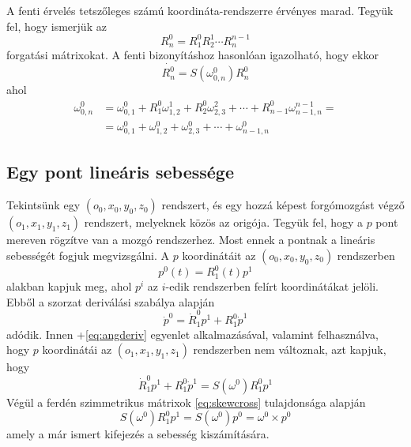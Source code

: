\documentclass[12pt,a4paper]{report}
\theoremstyle{remark}
\theoremstyle{definition}
\begin{document}
A fenti érvelés tetszőleges számú koordináta-rendszerre érvényes marad. Tegyük fel, hogy ismerjük az
\begin{equation}
R^{0}_{n} = R^{0}_{1}R^{1}_{2} \cdots R^{n-1}_{n}
\end{equation}
forgatási mátrixokat. A fenti bizonyításhoz hasonlóan igazolható, hogy ekkor
\begin{equation}
\dot{R^{0}_{n}} = S(\omega^{0}_{0,n}) R^{0}_{n}
\end{equation}
ahol
\begin{equation} \label{eq:angularsum}
\begin{aligned}
\omega^{0}_{0,n} &= \omega^{0}_{0,1} + R^{0}_{1}\omega^{1}_{1,2} + R^{0}_{2}\omega^{2}_{2,3} + \cdots +
    R^{0}_{n-1}\omega^{n-1}_{n-1,n} = \\ 
&= \omega^{0}_{0,1} + \omega^{0}_{1,2} + \omega^{0}_{2,3} + \cdots + \omega^{0}_{n-1,n}
\end{aligned}
\end{equation}

\subsection{Egy pont lineáris sebessége}
Tekintsünk egy $(o_0, x_0, y_0, z_0)$ rendszert, és egy hozzá képest forgómozgást végző $(o_1, x_1, y_1, z_1)$ 
rendszert, melyeknek közös az origója. Tegyük fel, hogy a $p$ pont mereven rögzítve van a mozgó rendszerhez. Most 
ennek a pontnak a lineáris sebességét fogjuk megvizsgálni. A $p$ koordinátáit az $(o_0, x_0, y_0, z_0)$ rendszerben
\begin{equation}
p^0(t) = R^{0}_{1}(t)p^1
\end{equation}
alakban kapjuk meg, ahol $p^i$ az $i$-edik rendszerben felírt koordinátákat jelöli. Ebből a szorzat deriválási 
szabálya alapján
\begin{equation}
\dot{p}^0 = \dot{R}^{0}_{1}p^1 + R^{0}_{1}\dot{p}^1
\end{equation}
adódik. Innen \az+\eqref{eq:angderiv} egyenlet alkalmazásával, valamint felhasználva, hogy $p$ koordinátái az 
$(o_1, x_1, y_1, z_1)$ rendszerben nem változnak, azt kapjuk, hogy
\begin{equation}
\dot{R}^{0}_{1}p^1 + R^{0}_{1}\dot{p}^1 = S(\omega^0)R^{0}_{1}p^1
\end{equation}
Végül a ferdén szimmetrikus mátrixok \eqref{eq:skewcross} tulajdonsága alapján
\begin{equation}
S(\omega^0)R^{0}_{1}p^1 = S(\omega^0)p^0 = \omega^0 \times p^0
\end{equation}
amely a már ismert kifejezés a sebesség kiszámítására.
\end{document}
